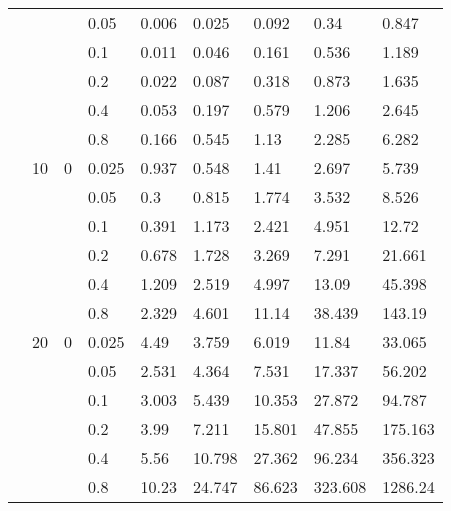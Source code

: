 \begin{longtable}{|l|l|l|l|l|l|l|l|l|}
\cmidrule{4-9} &     &          & 0.05           & 0.006      & 0.025      & 0.092      & 0.34       & 0.847      \\
\cmidrule{4-9} &     &          & 0.1            & 0.011      & 0.046      & 0.161      & 0.536      & 1.189      \\
\cmidrule{4-9} &     &          & 0.2            & 0.022      & 0.087      & 0.318      & 0.873      & 1.635      \\
\cmidrule{4-9} &     &          & 0.4            & 0.053      & 0.197      & 0.579      & 1.206      & 2.645      \\
\cmidrule{4-9} &     &          & 0.8            & 0.166      & 0.545      & 1.13       & 2.285      & 6.282      \\
\cmidrule{2-9} & 10  & 0        & 0.025          & 0.937      & 0.548      & 1.41       & 2.697      & 5.739      \\
\cmidrule{4-9} &     &          & 0.05           & 0.3        & 0.815      & 1.774      & 3.532      & 8.526      \\
\cmidrule{4-9} &     &          & 0.1            & 0.391      & 1.173      & 2.421      & 4.951      & 12.72      \\
\cmidrule{4-9} &     &          & 0.2            & 0.678      & 1.728      & 3.269      & 7.291      & 21.661     \\
\cmidrule{4-9} &     &          & 0.4            & 1.209      & 2.519      & 4.997      & 13.09      & 45.398     \\
\cmidrule{4-9} &     &          & 0.8            & 2.329      & 4.601      & 11.14      & 38.439     & 143.19     \\
\cmidrule{2-9} & 20  & 0        & 0.025          & 4.49       & 3.759      & 6.019      & 11.84      & 33.065     \\
\cmidrule{4-9} &     &          & 0.05           & 2.531      & 4.364      & 7.531      & 17.337     & 56.202     \\
\cmidrule{4-9} &     &          & 0.1            & 3.003      & 5.439      & 10.353     & 27.872     & 94.787     \\
\cmidrule{4-9} &     &          & 0.2            & 3.99       & 7.211      & 15.801     & 47.855     & 175.163    \\
\cmidrule{4-9} &     &          & 0.4            & 5.56       & 10.798     & 27.362     & 96.234     & 356.323    \\
\cmidrule{4-9} &     &          & 0.8            & 10.23      & 24.747     & 86.623     & 323.608    & 1286.24    \\

\end{longtable}
